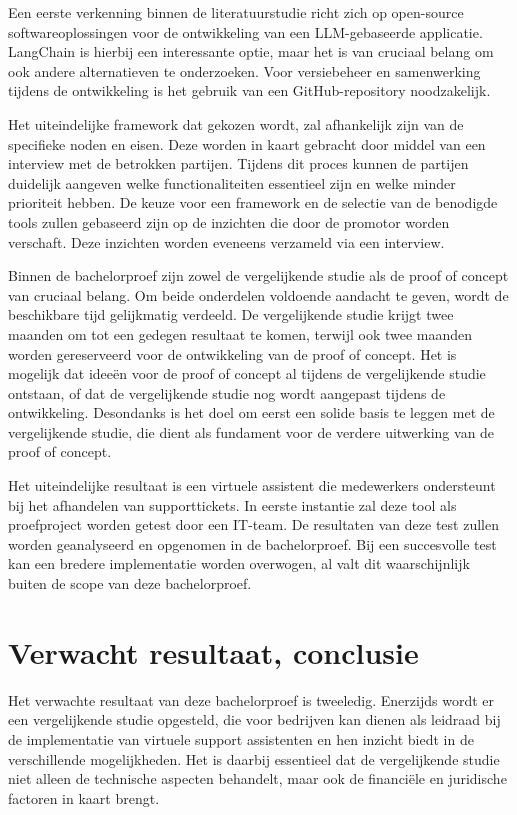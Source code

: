 Een eerste verkenning binnen de literatuurstudie richt zich op open-source softwareoplossingen voor de ontwikkeling van een LLM-gebaseerde applicatie. LangChain is hierbij een interessante optie, maar het is van cruciaal belang om ook andere alternatieven te onderzoeken. Voor versiebeheer en samenwerking tijdens de ontwikkeling is het gebruik van een GitHub-repository noodzakelijk.

Het uiteindelijke framework dat gekozen wordt, zal afhankelijk zijn van de specifieke noden en eisen. Deze worden in kaart gebracht door middel van een interview met de betrokken partijen. Tijdens dit proces kunnen de partijen duidelijk aangeven welke functionaliteiten essentieel zijn en welke minder prioriteit hebben. De keuze voor een framework en de selectie van de benodigde tools zullen gebaseerd zijn op de inzichten die door de promotor worden verschaft. Deze inzichten worden eveneens verzameld via een interview.

Binnen de bachelorproef zijn zowel de vergelijkende studie als de proof of concept van cruciaal belang. Om beide onderdelen voldoende aandacht te geven, wordt de beschikbare tijd gelijkmatig verdeeld. De vergelijkende studie krijgt twee maanden om tot een gedegen resultaat te komen, terwijl ook twee maanden worden gereserveerd voor de ontwikkeling van de proof of concept. Het is mogelijk dat ideeën voor de proof of concept al tijdens de vergelijkende studie ontstaan, of dat de vergelijkende studie nog wordt aangepast tijdens de ontwikkeling. Desondanks is het doel om eerst een solide basis te leggen met de vergelijkende studie, die dient als fundament voor de verdere uitwerking van de proof of concept.

Het uiteindelijke resultaat is een virtuele assistent die medewerkers ondersteunt bij het afhandelen van supporttickets. In eerste instantie zal deze tool als proefproject worden getest door een IT-team. De resultaten van deze test zullen worden geanalyseerd en opgenomen in de bachelorproef. Bij een succesvolle test kan een bredere implementatie worden overwogen, al valt dit waarschijnlijk buiten de scope van deze bachelorproef.


\section{Verwacht resultaat, conclusie}%
\label{sec:verwachte_resultaten}

Het verwachte resultaat van deze bachelorproef is tweeledig. Enerzijds wordt er een vergelijkende studie opgesteld, die voor bedrijven kan dienen als leidraad bij de implementatie van virtuele support assistenten en hen inzicht biedt in de verschillende mogelijkheden. Het is daarbij essentieel dat de vergelijkende studie niet alleen de technische aspecten behandelt, maar ook de financiële en juridische factoren in kaart brengt.

